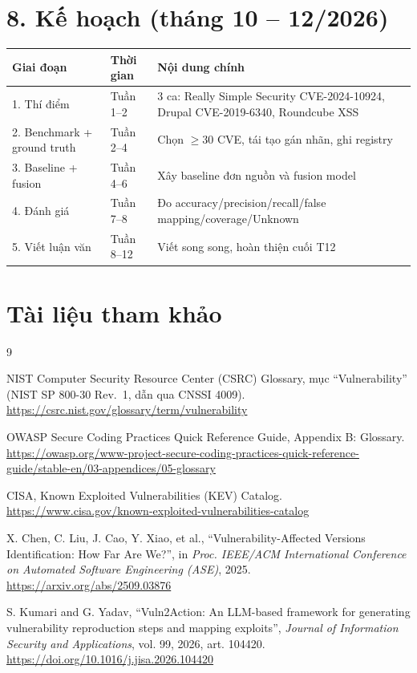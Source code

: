 \documentclass[11pt,a4paper]{article}
\begin{document}
\section*{8. Kế hoạch (tháng 10 -- 12/2026)}

\begin{center}
\begin{tabular}{@{}p{4.0cm}p{1.8cm}p{9.4cm}@{}}
\toprule
\textbf{Giai đoạn} & \textbf{Thời gian} & \textbf{Nội dung chính} \\
\midrule
1. Thí điểm & Tuần 1--2 & 3 ca: Really Simple Security CVE-2024-10924, Drupal CVE-2019-6340, Roundcube XSS \\
2. Benchmark + ground truth & Tuần 2--4 & Chọn $\ge 30$ CVE, tái tạo gán nhãn, ghi registry \\
3. Baseline + fusion & Tuần 4--6 & Xây baseline đơn nguồn và fusion model \\
4. Đánh giá & Tuần 7--8 & Đo accuracy/precision/recall/false mapping/coverage/Unknown \\
5. Viết luận văn & Tuần 8--12 & Viết song song, hoàn thiện cuối T12 \\
\bottomrule
\end{tabular}
\end{center}

\section*{Tài liệu tham khảo}

\begin{thebibliography}{9}

 NIST Computer Security Resource Center (CSRC) Glossary, mục ``Vulnerability'' (NIST SP 800-30 Rev.~1, dẫn qua CNSSI 4009). \url{https://csrc.nist.gov/glossary/term/vulnerability}

 OWASP Secure Coding Practices Quick Reference Guide, Appendix B: Glossary. \url{https://owasp.org/www-project-secure-coding-practices-quick-reference-guide/stable-en/03-appendices/05-glossary}

 CISA, Known Exploited Vulnerabilities (KEV) Catalog. \url{https://www.cisa.gov/known-exploited-vulnerabilities-catalog}

 X. Chen, C. Liu, J. Cao, Y. Xiao, et al., ``Vulnerability-Affected Versions Identification: How Far Are We?'', in \emph{Proc. IEEE/ACM International Conference on Automated Software Engineering (ASE)}, 2025. \url{https://arxiv.org/abs/2509.03876}

 S. Kumari and G. Yadav, ``Vuln2Action: An LLM-based framework for generating vulnerability reproduction steps and mapping exploits'', \emph{Journal of Information Security and Applications}, vol. 99, 2026, art. 104420. \url{https://doi.org/10.1016/j.jisa.2026.104420}

\end{thebibliography}
\end{document}
